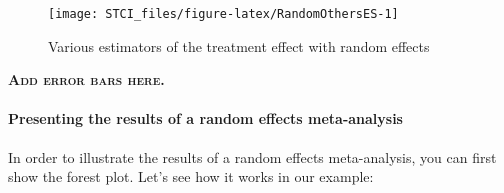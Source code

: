\documentclass[
]{book}
\theoremstyle{definition}
\theoremstyle{definition}
\theoremstyle{definition}
\theoremstyle{definition}
\theoremstyle{remark}
\begin{document}
\begin{figure}[htbp]

{\centering \texttt{[image: STCI\_files/figure-latex/RandomOthersES-1]} 

}

\caption{Various estimators of the treatment effect with random effects}\label{fig:RandomOthersES}
\end{figure}

\textbf{\textsc{Add error bars here.}}

\hypertarget{presenting-the-results-of-a-random-effects-meta-analysis}{%
\paragraph{Presenting the results of a random effects meta-analysis}\label{presenting-the-results-of-a-random-effects-meta-analysis}}

In order to illustrate the results of a random effects meta-analysis, you can first show the forest plot.
Let's see how it works in our example:
\end{document}
